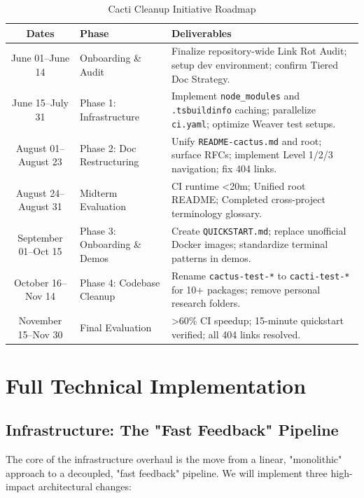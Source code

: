 \begin{table}[!htbp]
\centering
\large
\begin{tabularx}{\textwidth}{c p{3.2cm} X}
\toprule
\textbf{\color{primary} Dates} & \textbf{\color{primary} Phase} & \textbf{\color{primary} Deliverables} \\
\midrule
June 01--June 14 & Onboarding \& Audit & Finalize repository-wide Link Rot Audit; setup dev environment; confirm Tiered Doc Strategy. \\
\addlinespace
June 15--July 31 & Phase 1: Infrastructure & Implement \texttt{node\_modules} and \texttt{.tsbuildinfo} caching; parallelize \texttt{ci.yaml}; optimize Weaver test setups. \\
\addlinespace
August 01--August 23 & Phase 2: Doc Restructuring & Unify \texttt{README-cactus.md} and root; surface RFCs; implement Level 1/2/3 navigation; fix 404 links. \\
\addlinespace
August 24--August 31 & Midterm Evaluation & CI runtime <20m; Unified root README; Completed cross-project terminology glossary. \\
\addlinespace
September 01--Oct 15 & Phase 3: Onboarding \& Demos & Create \texttt{QUICKSTART.md}; replace unofficial Docker images; standardize terminal patterns in demos. \\
\addlinespace
October 16--Nov 14 & Phase 4: Codebase Cleanup & Rename \texttt{cactus-test-*} to \texttt{cacti-test-*} for 10+ packages; remove personal research folders. \\
\addlinespace
November 15--Nov 30 & Final Evaluation & >60\% CI speedup; 15-minute quickstart verified; all 404 links resolved. \\
\bottomrule
\end{tabularx}
\caption{Cacti Cleanup Initiative Roadmap}
\label{tab:timeline}
\end{table}

\section{Full Technical Implementation}

\subsection{Infrastructure: The "Fast Feedback" Pipeline}

The core of the infrastructure overhaul is the move from a linear, "monolithic" approach to a decoupled, "fast feedback" pipeline. We will implement three high-impact architectural changes:

